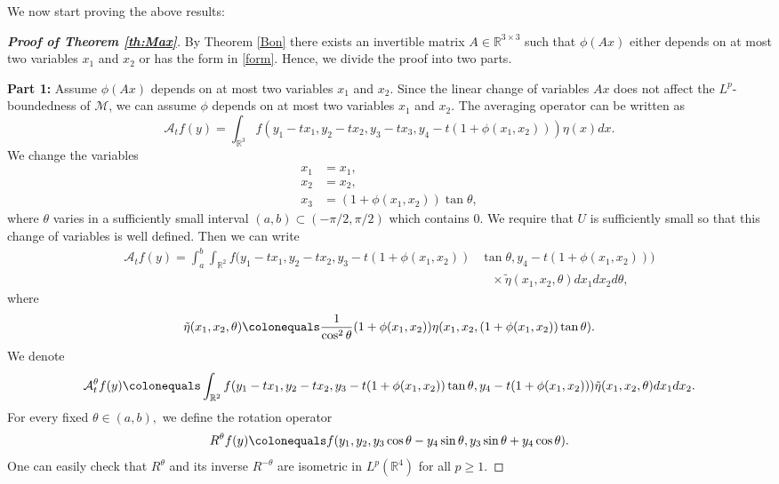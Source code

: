 \documentclass[a4paper, 11pt]{article}
\theoremstyle{plain}
\theoremstyle{definition}
\theoremstyle{lemma}
\theoremstyle{Remark}
\theoremstyle{proposition}
\theoremstyle{corollary}
\theoremstyle{example}
\theoremstyle{assumption}
\begin{document}
\bigskip

  We now start proving the above results:
 \begin{proof}[\textbf{Proof of Theorem \ref{th:Max}}]
 By Theorem \ref{Bon} there exists an invertible matrix $A\in \mathbb{R}^{3\times 3}$ such that
$ \phi(Ax)$ either depends on at most two variables $x_1$ and $x_2$ or has the form in \eqref{form}. Hence, we divide the proof into two parts.

\bigskip
\textbf{Part 1:} Assume $ \phi(Ax)$ depends on at most two variables $x_1$ and $x_2$. Since the  linear change of variables  $Ax $ does not affect the $L^p$-boundedness of $\mathcal{M}$,
 we can assume $\phi$ depends on  at most two variables $x_1$ and $x_2$.
The averaging operator can be written as
$$\mathcal{A}_tf(y)=
\int_{\mathbb{R}^3}f(y_1-tx_1,y_2-tx_2,y_3-tx_3, y_4-t(1+ \phi(x_1,x_2))) \eta(x)dx.$$
 We change the variables
 \begin{align*}
 x_1&=x_1,\\
 x_2&=x_2,\\
 x_3&=(1+ \phi(x_1,x_2))\tan{\theta},
\end{align*}
where $\theta$ varies in a sufficiently small interval $(a,b)\subset (-\pi/2,\pi/2)$ which contains $0.$  We require that $U$ is  sufficiently small so that this change of variables is well defined. Then we can write
 \begin{align*}
 \mathcal{A}_t f(y)=\int_{a}^{b}
\int_{\mathbb{R}^2}f(y_1-tx_1,y_2-tx_2,y_3-t(1+ \phi(x_1,x_2))&\tan{\theta}, y_4-t(1+ \phi(x_1,x_2)))\\
&\,\,\,\,\,\times \tilde{\eta} (x_1,x_2, \theta)dx_1dx_2d\theta,
\end{align*}
where $$\tilde{\eta} (x_1,x_2, \theta)\colonequals \frac{1}{\cos^{2}{\theta}} (1+ \phi(x_1,x_2)) \eta (x_1,x_2, (1+ \phi(x_1,x_2))\tan{\theta}). $$
We denote
$$\mathcal{A}_t^{\theta} f(y)\colonequals
\int_{\mathbb{R}^2}f(y_1-tx_1,y_2-tx_2,y_3-t(1+ \phi(x_1,x_2))\tan{\theta}, y_4-t(1+ \phi(x_1,x_2))) \tilde{\eta} (x_1,x_2, \theta)dx_1dx_2.$$
For every fixed $\theta\in (a,b),$ we  define the rotation operator
$$R^{\theta}f(y)\colonequals f(y_1,y_2, y_3\cos{\theta}-y_4\sin{\theta}, y_3\sin{\theta}+y_4\cos{\theta}).$$
One can easily check that $R^{\theta}$ and its inverse $R^{-\theta}$ are isometric in $L^p(\mathbb{R}^{4})$ for all $p\geq 1.$

\end{proof}
\end{document}
